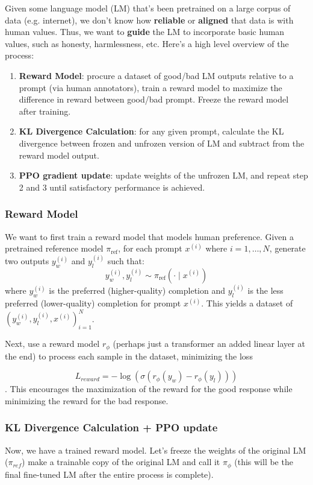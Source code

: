 \documentclass[12pt]{article}
\newcommand{\logp}[1]{%
  \log\left(#1\right)%
}
\newcommand{\sigp}[1]{%
  \sigma\left(#1\right)%
}
\begin{document}
Given some language model (LM) that's been pretrained on a large corpus of data (e.g. internet), we don't know how \textbf{reliable} or \textbf{aligned} that data is with human values. Thus, we want to \textbf{guide} the LM to incorporate basic human values, such as honesty, harmlessness, etc. Here's a high level overview of the process:

\begin{enumerate}
    \item \textbf{Reward Model}: procure a dataset of good/bad LM outputs relative to a prompt (via human annotators), train a reward model to maximize the difference in reward between good/bad prompt. Freeze the reward model after training. 
    \item \textbf{KL Divergence Calculation}: for any given prompt, calculate the KL divergence between frozen and unfrozen version of LM and subtract from the reward model output. 
    \item \textbf{PPO gradient update}: update weights of the unfrozen LM, and repeat step 2 and 3 until satisfactory performance is achieved. 
\end{enumerate}

\subsubsection{Reward Model}
We want to first train a reward model that models human preference. Given a pretrained reference model $\pi_{\mathrm{ref}}$, for each prompt $x^{(i)}$ where $i = 1, \ldots, N$, generate two outputs $y_w^{(i)}$ and $y_l^{(i)}$ such that:
\[
y_w^{(i)}, y_l^{(i)} \sim \pi_{\mathrm{ref}}(\cdot \mid x^{(i)})
\]
where $y_w^{(i)}$ is the preferred (higher-quality) completion and $y_l^{(i)}$ is the less preferred (lower-quality) completion for prompt $x^{(i)}$. This yields a dataset of $(y_w^{(i)}, y_l^{(i)}, x^{(i)})_{i=1}^{N}$. 

Next, use a reward model $r_{\phi}$ (perhaps just a transformer an added linear layer at the end) to process each sample in the dataset, minimizing the loss 

\[L_{reward} = -\logp{\sigp{r_{\phi}(y_w) - r_{\phi}(y_l)}}\]. This encourages the maximization of the reward for the good response while minimizing the reward for the bad response. 

\subsubsection{KL Divergence Calculation + PPO update}
Now, we have a trained reward model. Let's freeze the weights of the original LM ($\pi_{ref}$) make a trainable copy of the original LM and call it $\pi_{\phi}$ (this will be the final fine-tuned LM after the entire process is complete). 
\end{document}
